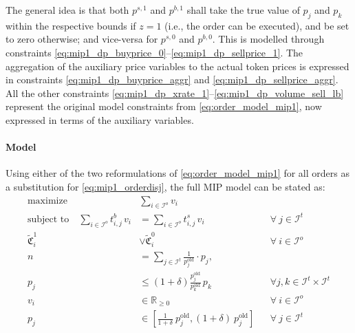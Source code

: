 \documentclass[11pt,parskip=full]{scrartcl}%
\newcommand*{\ie}{i.e., }
\newcommand*{\itokens}{\mathcal{I}^t}       %
\newcommand*{\iorders}{\mathcal{I}^o}       %
\begin{document}
The general idea is that both $ p^{s,1} $ and $ p^{b,1} $ shall take the true value of $ p_j $ and
$ p_k $ within the respective bounds if $ z = 1 $ (\ie the order can be executed), and be set to
zero otherwise; and vice-versa for $ p^{s,0} $ and $ p^{b,0} $.
This is modelled through constraints \eqref{eq:mip1_dp_buyprice_0}--\eqref{eq:mip1_dp_sellprice_1}.
The aggregation of the auxiliary price variables to the actual token prices is expressed in
constraints \eqref{eq:mip1_dp_buyprice_aggr} and \eqref{eq:mip1_dp_sellprice_aggr}.
All the other constraints \eqref{eq:mip1_dp_xrate_1}--\eqref{eq:mip1_dp_volume_sell_lb} represent
the original model constraints from \eqref{eq:order_model_mip1}, now expressed in terms of the
auxiliary variables.

\paragraph{Model}

Using either of the two reformulations of \eqref{eq:order_model_mip1} for all orders as a
substitution for \eqref{eq:mip1_orderdisj}, the full MIP model can be stated as:
\begin{subequations}
\begin{align}
  \text{maximize} \quad & \sum\limits_{i \in \iorders} v_i
  \label{eq:mip1_objective}
  \\[2mm]
  \text{subject to} \quad
  \sum\limits_{i \in \iorders} t^b_{i,j} \, v_i
  &= \sum\limits_{i \in \iorders} t^s_{i,j} \, v_i
  && \forall \> j \in \itokens
  \label{eq:mip1_tokenbalance}
  \\[4mm]
  \tilde{\mathfrak{C}}^1_i &\lor \tilde{\mathfrak{C}}^0_i
  && \forall \> i \in \iorders
  \label{eq:mip1_orderdisj} 
  \\[2mm]
  n
  &= \sum\limits_{j \in \itokens} \frac{1}{p^\mathrm{old}_j} \cdot p_j,
  \label{eq:mip1_reftoken}
  \\[1mm]
  p_j
  &\le \left(1+\delta\right) \frac{p^\mathrm{old}_j}{p^\mathrm{old}_k} \, p_k
  && \forall j,k \in \itokens \times \itokens
  \label{eq:mip1_maxfluct}
  \\[2mm]
  v_i
  &\in \mathbb{R}_{\ge 0}
  && \forall \> i \in \iorders
  \\[1mm]
  p_j
  &\in \left[ \frac{1} {1+\delta} \> p^\mathrm{old}_j, (1+\delta) \> p^\mathrm{old}_j \right]
  && \forall \> j \in \itokens
\end{align}
\label{eq:mip1}
\end{subequations}
\end{document}
